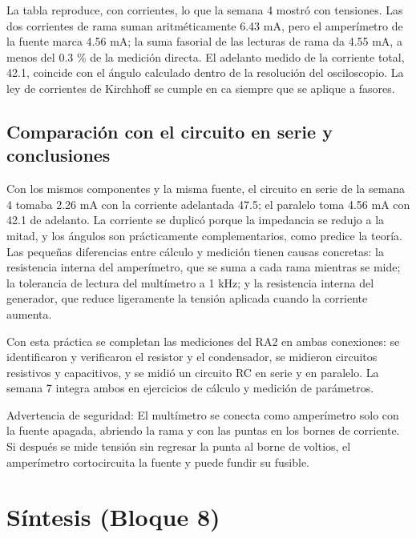 \documentclass[11pt,letterpaper]{article}
\begin{document}
La tabla reproduce, con corrientes, lo que la semana 4 mostró con tensiones. Las dos corrientes de rama suman aritméticamente 6.43 mA, pero el amperímetro de la fuente marca 4.56 mA; la suma fasorial de las lecturas de rama da 4.55 mA, a menos del 0.3 \% de la medición directa. El adelanto medido de la corriente total, 42.1\textdegree{}, coincide con el ángulo calculado dentro de la resolución del osciloscopio. La ley de corrientes de Kirchhoff se cumple en ca siempre que se aplique a fasores.

\subsection{Comparación con el circuito en serie y conclusiones}

Con los mismos componentes y la misma fuente, el circuito en serie de la semana 4 tomaba 2.26 mA con la corriente adelantada 47.5\textdegree{}; el paralelo toma 4.56 mA con 42.1\textdegree{} de adelanto. La corriente se duplicó porque la impedancia se redujo a la mitad, y los ángulos son prácticamente complementarios, como predice la teoría. Las pequeñas diferencias entre cálculo y medición tienen causas concretas: la resistencia interna del amperímetro, que se suma a cada rama mientras se mide; la tolerancia de lectura del multímetro a 1 kHz; y la resistencia interna del generador, que reduce ligeramente la tensión aplicada cuando la corriente aumenta.

Con esta práctica se completan las mediciones del RA2 en ambas conexiones: se identificaron y verificaron el resistor y el condensador, se midieron circuitos resistivos y capacitivos, y se midió un circuito RC en serie y en paralelo. La semana 7 integra ambos en ejercicios de cálculo y medición de parámetros.

\begin{nota}{Advertencia de seguridad:}
El multímetro se conecta como amperímetro solo con la fuente apagada, abriendo la rama y con las puntas en los bornes de corriente. Si después se mide tensión sin regresar la punta al borne de voltios, el amperímetro cortocircuita la fuente y puede fundir su fusible.
\end{nota}

\section{Síntesis (Bloque 8)}
\end{document}
